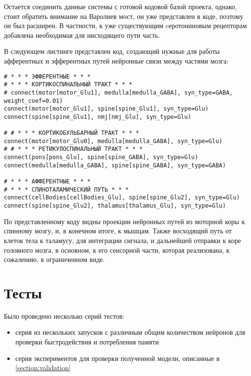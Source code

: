 Остается соединить данные системы с готовой кодовой базой проекта, однако, стоит обратить внимание на Варолиев мост, он уже представлен в коде, поэтому он был расширен. В частности, к уже существующим cеротониновым рецепторам добавлена необходимая для нисходящего пути часть.

В следующем листинге представлен код, создающий нужные для работы афферентных и эфферентных путей нейронные связи между частями мозга:
\begin{lstlisting}
# * * * ЭФФЕРЕНТНЫЕ * * *
# * * * КОРТИКОСПИНАЛЬНЫЙ ТРАКТ * * *
# connect(motor[motor_Glu1], medulla[medulla_GABA], syn_type=GABA, weight_coef=0.01)
connect(motor[motor_Glu1], spine[spine_Glu1], syn_type=Glu)
connect(spine[spine_Glu1], nmj[nmj_Glu], syn_type=Glu)

# # * * * КОРТИКОБУЛЬБАРНЫЙ ТРАКТ * * *
connect(motor[motor_Glu0], medulla[medulla_GABA], syn_type=Glu)
# # * * * РЕТИКУЛОСПИНАЛЬНЫЙ ТРАКТ * * *
connect(pons[pons_Glu], spine[spine_GABA], syn_type=Glu)
connect(medulla[medulla_GABA], spine[spine_GABA], syn_type=GABA)

# * * * АФФЕРЕНТНЫЕ * * *
# * * * СПИНОТАЛАМИЧЕСКИЙ ПУТЬ * * *
connect(cellBodies[cellBodies_Glu], spine[spine_Glu2], syn_type=Glu)
connect(spine[spine_Glu2], thalamus[thalamus_Glu], syn_type=Glu)
\end{lstlisting}

По представленному коду видны проекции нейронных путей из моторной коры к спинному мозгу, и, в конечном итоге, к мышцам. 
Также восходящий путь от клеток тела к таламусу, для интеграции сигнала, и дальнейшей отправки к коре головного мозга, в основном, к его сенсорной части, которая реализована, к сожалению, в ограниченном виде.

\section{Тесты}
Было проведено несколько серий тестов: 
\begin{itemize}
	\item серия из нескольких запусков с различным общим количеством нейронов для проверки быстродействия и потребления памяти
	\item серия экспериментов для проверки полученной модели, описанные в \ref{section:validation}
\end{itemize}
